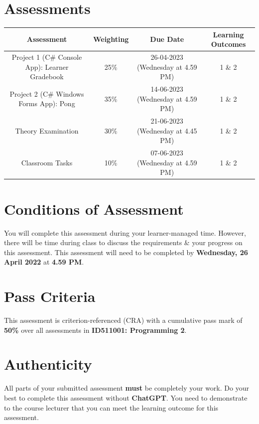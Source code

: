 \documentclass{article}
\begin{document}
\section*{Assessments}
\renewcommand{\arraystretch}{1.5}
\begin{tabular}{|c|c|c|c|}
	\hline
	\textbf{Assessment}                                 & \textbf{Weighting} & \textbf{Due Date}            & \textbf{Learning Outcomes} \\ \hline
	\small Project 1 (C\# Console App): Learner Gradebook  & \small 25\%        & \small 26-04-2023 (Wednesday at 4.59 PM)   & \small 1 \& 2                   \\ \hline
	\small Project 2 (C\# Windows Forms App): Pong & \small 35\%        & \small 14-06-2023 (Wednesday at 4.59 PM)   & \small 1 \& 2                   \\ \hline
	\small Theory Examination                        & \small 30\%        & \small 21-06-2023 (Wednesday at 4.45 PM)  & \small 1 \& 2                   \\ \hline
	\small Classroom Tasks                       & \small 10\%        & \small 07-06-2023 (Wednesday at 4.59 PM)  & \small 1 \& 2                   \\ \hline
\end{tabular} 

\section*{Conditions of Assessment}
You will complete this assessment during your learner-managed time. However, there will be time during class to discuss the requirements \& your progress on this assessment. This assessment will need to be completed by \textbf{Wednesday, 26 April 2022} at \textbf{4.59 PM}.

\section*{Pass Criteria}
This assessment is criterion-referenced (CRA) with a cumulative pass mark of \textbf{50\%} over all assessments in \textbf{ID511001: Programming 2}.

\section*{Authenticity}
All parts of your submitted assessment \textbf{must} be completely your work. Do your best to complete this assessment without \textbf{ChatGPT}. You need to demonstrate to the course lecturer that you can meet the learning outcome for this assessment. \\
 
\end{document}
